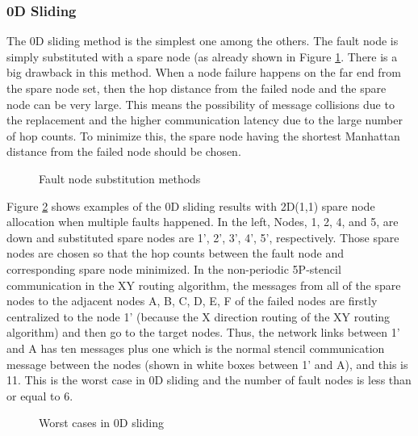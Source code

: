 \documentclass[10pt,conference,a4paper,fleqn]{IEEEtran}
\begin{document}
\subsubsection{0D Sliding}\label{sec:0d-sliding}

The 0D sliding method is the simplest one among the others. The fault node
is simply substituted with a spare node (as already shown in Figure
\ref{fig:node-substitution}. There is a big drawback in this
method. When a node failure happens on the far end from the spare node
set, then the hop distance from the failed node and the spare node can
be very large. This means the possibility of message collisions due to
the replacement and the higher communication latency due to the large
number of hop counts. To minimize this, the spare node having the
shortest Manhattan distance from the failed node should be chosen. 

\begin{figure}[ht]
\begin{center}
  \caption{Fault node substitution methods} 
  \label{fig:node-substitution}
\end{center}
\end{figure}

Figure \ref{fig:0d-worst-cases} shows examples of the 0D sliding results
with 2D(1,1) spare node allocation when multiple faults happened. In
the left, Nodes, 1, 2, 4, and 5, are down and substituted spare nodes are
1', 2', 3', 4', 5', respectively. Those spare nodes are chosen so that
the hop counts between the fault node and corresponding spare node
minimized. In the non-periodic 5P-stencil communication in the XY
routing algorithm, 
the messages from all of the spare nodes to the adjacent nodes A, B,
C, D, E, F of the failed nodes are firstly centralized to the node 1'
(because the X direction routing of the XY routing algorithm) and then
go to the target nodes. Thus, the network links between 1' and A has
ten messages plus one which is the normal stencil communication message
between the nodes (shown in white boxes between 1' and A), and this is
11. This is the worst case in 0D sliding and the number of fault nodes
is less than or equal to 6. 

\begin{figure}[ht]
\begin{center}
  \caption{Worst cases in 0D sliding} 
  \label{fig:0d-worst-cases}
\end{center}
\end{figure}
\end{document}
